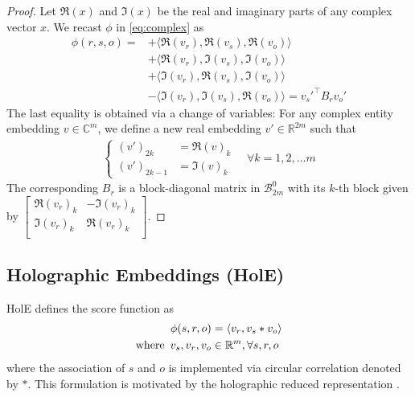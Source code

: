 \documentclass{article}
\begin{document}
\begin{proof}
    Let $\Re(x)$ and $\Im(x)$ be the real and imaginary parts of any complex vector $x$. We recast $\phi$ in \eqref{eq:complex} as
\begin{align}
    \phi(r, s, o) 
    = &+ \big\langle \Re(v_r), \Re(v_s), \Re(v_o) \big\rangle \\
    &+ \big\langle \Re(v_r), \Im(v_s), \Im(v_o) \big\rangle \\
    &+ \big\langle \Im(v_r), \Re(v_s), \Im(v_o) \big\rangle \\
    &- \big\langle \Im(v_r), \Im(v_s), \Re(v_o) \big\rangle
    = {v_s'}^\top B_r v_o'
\end{align}
The last equality is obtained via a change of variables:
For any complex entity embedding $v\in \mathbb{C}^{m}$,
we define a new real embedding $v' \in \mathbb{R}^{2m}$ such that
\begin{align}
    \begin{cases}
        (v')_{2k} &= \Re(v)_k \\
        (v')_{2k-1} &= \Im(v)_k
    \end{cases} \quad \forall k = 1,2,\dots m
\end{align}
The corresponding $B_r$ is a block-diagonal matrix in $\mathcal{B}^0_{2m}$ with its $k$-th block given by
$
    \begin{bmatrix}
        \Re(v_r)_k & - \Im(v_r)_k \\
        \Im(v_r)_k & \Re(v_r)_k \\
    \end{bmatrix}
    $.
\end{proof}



\subsection{Holographic Embeddings (HolE)}
HolE \cite{DBLP:conf/aaai/NickelRP16} defines the score function as
\begin{align}
    \phi(s, r, o) &= \langle v_r, v_s \ast v_o \rangle \\
    \text{where} \enskip v_s, v_r, v_o &\in \mathbb{R}^m, \forall s, r, o
    \label{eq:hole}
\end{align}
where the association of $s$ and $o$ is implemented via circular correlation denoted by $\ast$.
This formulation is motivated by the holographic reduced representation \cite{plate2003holographic}.
\end{document}
